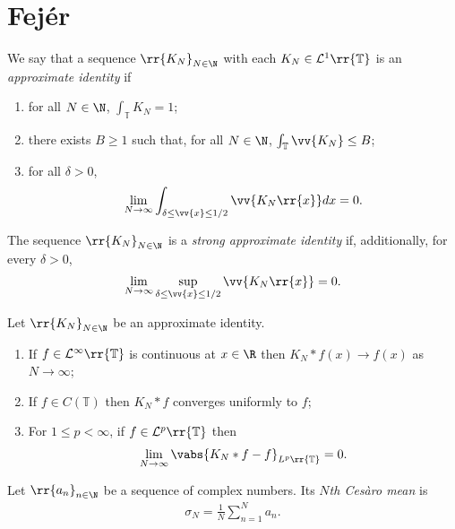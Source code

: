 \documentclass{article}
\begin{document}
\section{Fej\'er}

\begin{definition}
  We say that a sequence $\rr{K_N}_{N\in\N}$ with each $K_N\in\mathcal L^1\rr{\mathbb T}$
  is an \emph{approximate identity} if
  \begin{enumerate}
    \item for all $N\in\N$, $\int_{\mathbb T} K_N = 1$;
    \item there exists $B\geq 1$ such that, for all $N\in\N$, $\int_{\mathbb T}\vv{K_N}\leq B$;
    \item for all $\delta>0$,
      \begin{align*}
        \lim_{N\to\infty}\int_{\delta\leq\vv{x}\leq 1/2}\vv{K_N\rr{x}} dx = 0.
      \end{align*}
  \end{enumerate}
  The sequence $\rr{K_N}_{N\in\N}$ is a \emph{strong approximate identity} if, additionally,
  for every $\delta>0$,
  \begin{align*}
    \lim_{N\to\infty} \sup_{\delta\leq\vv{x}\leq 1/2}\vv{K_N\rr{x}}=0.
  \end{align*}
\end{definition}

\begin{theorem}
  Let $\rr{K_N}_{N\in\N}$ be an approximate identity.
  \begin{enumerate}
    \item If $f\in\mathcal L^\infty\rr{\mathbb T}$ is continuous at $x\in\R$ then
      $K_N * f(x) \to f(x)$ as $N\to\infty$;
    \item If $f\in C(\mathbb T)$ then $K_N*f$ converges uniformly to $f$;
    \item For $1\leq p<\infty$, if $f\in\mathcal L^p\rr{\mathbb T}$ then
      \begin{align*}
        \lim_{N\to\infty}\vabs{K_N*f-f}_{L^p\rr{\mathbb T}}=0.
      \end{align*}
  \end{enumerate}
\end{theorem}

\begin{definition}
  Let $\rr{a_n}_{n\in\N}$ be a sequence of complex numbers. Its \emph{$N$th Ces\`aro mean}
  is
  \begin{align*}
    \sigma_N = \frac{1}{N}\sum_{n=1}^N a_n.
  \end{align*}
\end{definition}
\end{document}
